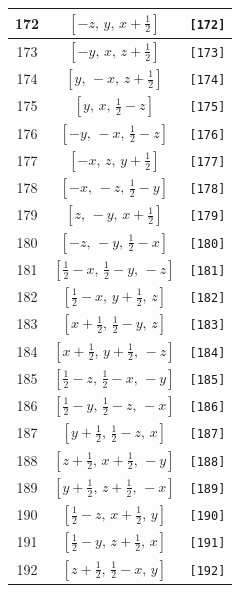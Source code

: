 \documentclass[fleqn,8pt]{jsarticle}
\begin{document}
\begin{longtable}{ccc}
172 & $\left[ - z,\, y,\, x + \frac{1}{2} \right]$ & {\tt [172]} \\ \hline
173 & $\left[ - y,\, x,\, z + \frac{1}{2} \right]$ & {\tt [173]} \\ \hline
174 & $\left[ y,\, - x,\, z + \frac{1}{2} \right]$ & {\tt [174]} \\ \hline
175 & $\left[ y,\, x,\, \frac{1}{2} - z \right]$ & {\tt [175]} \\ \hline
176 & $\left[ - y,\, - x,\, \frac{1}{2} - z \right]$ & {\tt [176]} \\ \hline
177 & $\left[ - x,\, z,\, y + \frac{1}{2} \right]$ & {\tt [177]} \\ \hline
178 & $\left[ - x,\, - z,\, \frac{1}{2} - y \right]$ & {\tt [178]} \\ \hline
179 & $\left[ z,\, - y,\, x + \frac{1}{2} \right]$ & {\tt [179]} \\ \hline
180 & $\left[ - z,\, - y,\, \frac{1}{2} - x \right]$ & {\tt [180]} \\ \hline
181 & $\left[ \frac{1}{2} - x,\, \frac{1}{2} - y,\, - z \right]$ & {\tt [181]} \\ \hline
182 & $\left[ \frac{1}{2} - x,\, y + \frac{1}{2},\, z \right]$ & {\tt [182]} \\ \hline
183 & $\left[ x + \frac{1}{2},\, \frac{1}{2} - y,\, z \right]$ & {\tt [183]} \\ \hline
184 & $\left[ x + \frac{1}{2},\, y + \frac{1}{2},\, - z \right]$ & {\tt [184]} \\ \hline
185 & $\left[ \frac{1}{2} - z,\, \frac{1}{2} - x,\, - y \right]$ & {\tt [185]} \\ \hline
186 & $\left[ \frac{1}{2} - y,\, \frac{1}{2} - z,\, - x \right]$ & {\tt [186]} \\ \hline
187 & $\left[ y + \frac{1}{2},\, \frac{1}{2} - z,\, x \right]$ & {\tt [187]} \\ \hline
188 & $\left[ z + \frac{1}{2},\, x + \frac{1}{2},\, - y \right]$ & {\tt [188]} \\ \hline
189 & $\left[ y + \frac{1}{2},\, z + \frac{1}{2},\, - x \right]$ & {\tt [189]} \\ \hline
190 & $\left[ \frac{1}{2} - z,\, x + \frac{1}{2},\, y \right]$ & {\tt [190]} \\ \hline
191 & $\left[ \frac{1}{2} - y,\, z + \frac{1}{2},\, x \right]$ & {\tt [191]} \\ \hline
192 & $\left[ z + \frac{1}{2},\, \frac{1}{2} - x,\, y \right]$ & {\tt [192]} \\
\end{longtable}
\end{document}
